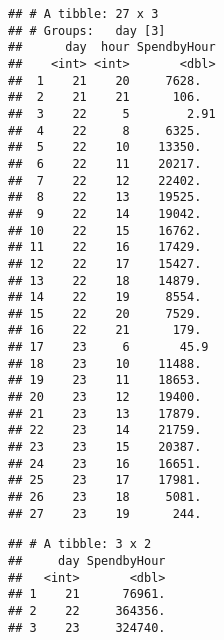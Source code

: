\documentclass[]{article}
\newenvironment{Shaded}{\begin{snugshade}}{\end{snugshade}}
\newcommand{\KeywordTok}[1]{\textcolor[rgb]{0.13,0.29,0.53}{\textbf{#1}}}
\newcommand{\DataTypeTok}[1]{\textcolor[rgb]{0.13,0.29,0.53}{#1}}
\newcommand{\DecValTok}[1]{\textcolor[rgb]{0.00,0.00,0.81}{#1}}
\newcommand{\StringTok}[1]{\textcolor[rgb]{0.31,0.60,0.02}{#1}}
\newcommand{\CommentTok}[1]{\textcolor[rgb]{0.56,0.35,0.01}{\textit{#1}}}
\newcommand{\OperatorTok}[1]{\textcolor[rgb]{0.81,0.36,0.00}{\textbf{#1}}}
\newcommand{\NormalTok}[1]{#1}
\begin{document}
\begin{Shaded}
\end{Shaded}

\begin{verbatim}
## # A tibble: 27 x 3
## # Groups:   day [3]
##      day  hour SpendbyHour
##    <int> <int>       <dbl>
##  1    21    20     7628.  
##  2    21    21      106.  
##  3    22     5        2.91
##  4    22     8     6325.  
##  5    22    10    13350.  
##  6    22    11    20217.  
##  7    22    12    22402.  
##  8    22    13    19525.  
##  9    22    14    19042.  
## 10    22    15    16762.  
## 11    22    16    17429.  
## 12    22    17    15427.  
## 13    22    18    14879.  
## 14    22    19     8554.  
## 15    22    20     7529.  
## 16    22    21      179.  
## 17    23     6       45.9 
## 18    23    10    11488.  
## 19    23    11    18653.  
## 20    23    12    19400.  
## 21    23    13    17879.  
## 22    23    14    21759.  
## 23    23    15    20387.  
## 24    23    16    16651.  
## 25    23    17    17981.  
## 26    23    18     5081.  
## 27    23    19      244.
\end{verbatim}

\begin{Shaded}
\end{Shaded}

\begin{verbatim}
## # A tibble: 3 x 2
##     day SpendbyHour
##   <int>       <dbl>
## 1    21      76961.
## 2    22     364356.
## 3    23     324740.
\end{verbatim}

\begin{Shaded}
\end{Shaded}
\end{document}
